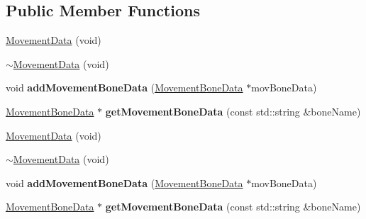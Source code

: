 \subsection*{Public Member Functions}
\begin{DoxyCompactItemize}
\item 
\hyperlink{classcocostudio_1_1MovementData_ae27f0c1a3b878adbe5fd83699df47c80}{Movement\+Data} (void)
\item 
\hyperlink{classcocostudio_1_1MovementData_a93f2757266bf387a3670bea028cf3756}{$\sim$\+Movement\+Data} (void)
\item 
\mbox{\label{classcocostudio_1_1MovementData_ac3302641c645a1e8f4c927e9f3a278e1}} 
void {\bfseries add\+Movement\+Bone\+Data} (\hyperlink{classcocostudio_1_1MovementBoneData}{Movement\+Bone\+Data} $\ast$mov\+Bone\+Data)
\item 
\mbox{\label{classcocostudio_1_1MovementData_a46a0b75042ab566b47f83347aea6cd06}} 
\hyperlink{classcocostudio_1_1MovementBoneData}{Movement\+Bone\+Data} $\ast$ {\bfseries get\+Movement\+Bone\+Data} (const std\+::string \&bone\+Name)
\item 
\hyperlink{classcocostudio_1_1MovementData_ae27f0c1a3b878adbe5fd83699df47c80}{Movement\+Data} (void)
\item 
\hyperlink{classcocostudio_1_1MovementData_a93f2757266bf387a3670bea028cf3756}{$\sim$\+Movement\+Data} (void)
\item 
\mbox{\label{classcocostudio_1_1MovementData_ac3302641c645a1e8f4c927e9f3a278e1}} 
void {\bfseries add\+Movement\+Bone\+Data} (\hyperlink{classcocostudio_1_1MovementBoneData}{Movement\+Bone\+Data} $\ast$mov\+Bone\+Data)
\item 
\mbox{\label{classcocostudio_1_1MovementData_a9c5289c6b74f3887b80429ce2969c3f6}} 
\hyperlink{classcocostudio_1_1MovementBoneData}{Movement\+Bone\+Data} $\ast$ {\bfseries get\+Movement\+Bone\+Data} (const std\+::string \&bone\+Name)
\end{DoxyCompactItemize}

